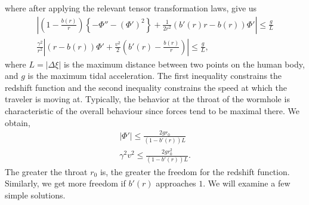 \documentclass[%
 reprint,
 amsmath,amssymb
 aps,
]{revtex4}
\theoremstyle{remark}
\begin{document}
where after applying the relevant tensor transformation laws, give us
\begin{align}
    \left|\left(1-\frac{b(r)}{r}\right)\left\{-\Phi''-(\Phi')^2\right\}+\frac{1}{2r^2}(b'(r)r-b(r))\Phi'\right| \le \frac{g}{L} \\ 
    \frac{\gamma^2}{r^2}\left|(r-b(r))\Phi'+\frac{v^2}{2}\left(b'(r) - \frac{b(r)}{r}\right)\right| \le \frac{g}{L},
\end{align}
where $L=|\Delta \xi|$ is the maximum distance between two points on the human body, and $g$ is the maximum tidal acceleration. The first inequality constrains the redshift function and the second inequality constrains the speed at which the traveler is moving at. Typically, the behavior at the throat of the wormhole is characteristic of the overall behaviour since forces tend to be maximal there. We obtain,
\begin{align}
    |\Phi'| \le \frac{2gr_0}{(1-b'(r))L} \\ 
    \gamma^2v^2 \le \frac{2gr_0^2}{(1-b'(r))L}.
\end{align} 
The greater the throat $r_0$ is, the greater the freedom for the redshift function. Similarly, we get more freedom if $b'(r)$ approaches $1.$ We will examine a few simple solutions.
\end{document}
